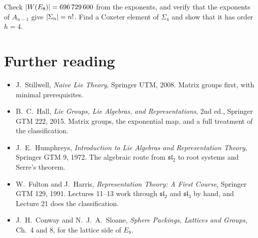 \begin{exercise}
Check $\left\lvert W(E_8) \right\rvert=696\,729\,600$ from the exponents, and verify that the exponents of $A_{n-1}$ give
$\left\lvert \Sigma_n \right\rvert=n!$. Find a Coxeter element of $\Sigma_4$ and show that it has order $h=4$.
\end{exercise}

\section*{Further reading}
\begin{itemize}[nosep]
\item J.~Stillwell, \emph{Naive Lie Theory}, Springer UTM, 2008. Matrix groups first, with minimal prerequisites.
\item B.~C.~Hall, \emph{Lie Groups, Lie Algebras, and Representations}, 2nd ed., Springer GTM 222, 2015.
  Matrix groups, the exponential map, and a full treatment of the classification.
\item J.~E.~Humphreys, \emph{Introduction to Lie Algebras and Representation Theory}, Springer GTM 9, 1972.
  The algebraic route from $\mathfrak{sl}_2$ to root systems and Serre's theorem.
\item W.~Fulton and J.~Harris, \emph{Representation Theory: A First Course}, Springer GTM 129, 1991.
  Lectures 11--13 work through $\mathfrak{sl}_2$ and $\mathfrak{sl}_3$ by hand, and Lecture 21 does the classification.
\item J.~H.~Conway and N.~J.~A.~Sloane, \emph{Sphere Packings, Lattices and Groups}, Ch.~4 and 8, for the
  lattice side of $E_8$.
\end{itemize}
